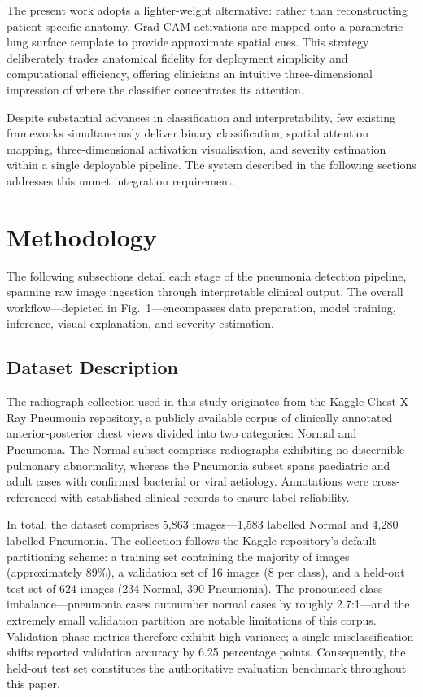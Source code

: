 \documentclass[conference]{IEEEtran}
\begin{document}
The present work adopts a lighter-weight alternative: rather than reconstructing patient-specific anatomy, Grad-CAM activations are mapped onto a parametric lung surface template to provide approximate spatial cues. This strategy deliberately trades anatomical fidelity for deployment simplicity and computational efficiency, offering clinicians an intuitive three-dimensional impression of where the classifier concentrates its attention.

Despite substantial advances in classification and interpretability, few existing frameworks simultaneously deliver binary classification, spatial attention mapping, three-dimensional activation visualisation, and severity estimation within a single deployable pipeline. The system described in the following sections addresses this unmet integration requirement.

\section{Methodology}

\noindent\hspace{0.5cm}The following subsections detail each stage of the pneumonia detection pipeline, spanning raw image ingestion through interpretable clinical output. The overall workflow---depicted in Fig.~1---encompasses data preparation, model training, inference, visual explanation, and severity estimation.

\subsection{Dataset Description}
The radiograph collection used in this study originates from the Kaggle Chest X-Ray Pneumonia repository, a publicly available corpus of clinically annotated anterior-posterior chest views divided into two categories: Normal and Pneumonia. The Normal subset comprises radiographs exhibiting no discernible pulmonary abnormality, whereas the Pneumonia subset spans paediatric and adult cases with confirmed bacterial or viral aetiology. Annotations were cross-referenced with established clinical records to ensure label reliability.

In total, the dataset comprises 5,863 images---1,583 labelled Normal and 4,280 labelled Pneumonia. The collection follows the Kaggle repository's default partitioning scheme: a training set containing the majority of images (approximately 89\%), a validation set of 16 images (8 per class), and a held-out test set of 624 images (234 Normal, 390 Pneumonia). The pronounced class imbalance---pneumonia cases outnumber normal cases by roughly 2.7:1---and the extremely small validation partition are notable limitations of this corpus. Validation-phase metrics therefore exhibit high variance; a single misclassification shifts reported validation accuracy by 6.25 percentage points. Consequently, the held-out test set constitutes the authoritative evaluation benchmark throughout this paper.
\end{document}
